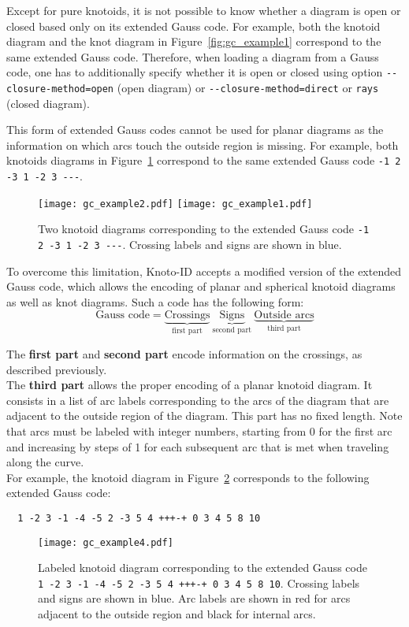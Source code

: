 Except for pure knotoids, it is not possible to know whether a diagram is open or closed based only on its extended Gauss code. For example, both the knotoid diagram and the knot diagram in Figure~\ref{fig:gc_example1} correspond to the same extended Gauss code. Therefore, when loading a diagram from a Gauss code, one has to additionally specify whether it is open or closed using option \lstinline{--closure-method=open} (open diagram) or \lstinline{--closure-method=direct} or \lstinline{rays} (closed diagram). 


This form of extended Gauss codes cannot be used for planar diagrams as the information on which arcs touch the outside region is missing. For example, both knotoids diagrams in Figure~\ref{fig:gc_example2} correspond to the same extended Gauss code \lstinline{-1 2 -3 1 -2 3 ---}.
\begin{figure}[t]
\centering
\texttt{[image: gc\_example2.pdf]}\hspace{1cm}
\texttt{[image: gc\_example1.pdf]}
\caption{Two knotoid diagrams corresponding to the extended Gauss code \lstinline{-1 2 -3 1 -2 3 ---}. Crossing labels and signs are shown in blue.}\label{fig:gc_example2}
\end{figure}

To overcome this limitation, Knoto-ID accepts a modified version of the extended Gauss code, which allows the encoding of planar and spherical knotoid diagrams as well as knot diagrams. Such a code has the following form:
\[
\mbox{Gauss code} = \underbrace{\mbox{Crossings}}_{\mbox{first part}} \ \underbrace{\mbox{Signs}}_{\mbox{second part}} \ \underbrace{\mbox{Outside arcs}}_{\mbox{third part}}
\]

The {\bf first part} and {\bf second part} encode information on the crossings, as described previously.\\

The {\bf third part} allows the proper encoding of a planar knotoid diagram. It consists in a list of arc labels corresponding to the arcs of the diagram that are adjacent to the outside region of the diagram. This part has no fixed length. Note that arcs must be labeled with integer numbers, starting from 0 for the first arc and increasing by steps of 1 for each subsequent arc that is met when traveling along the curve.\\


For example, the knotoid diagram in Figure~\ref{fig:gc_example3} corresponds to the following extended Gauss code:
\begin{lstlisting}
  1 -2 3 -1 -4 -5 2 -3 5 4 +++-+ 0 3 4 5 8 10
\end{lstlisting}
\begin{figure}[t]
\centering
\texttt{[image: gc\_example4.pdf]}
\caption{Labeled knotoid diagram corresponding to the extended Gauss code \lstinline{1 -2 3 -1 -4 -5 2 -3 5 4 +++-+ 0 3 4 5 8 10}. Crossing labels and signs are shown in blue. Arc labels are shown in red for arcs adjacent to the outside region and black for internal arcs.}\label{fig:gc_example3}
\end{figure}


